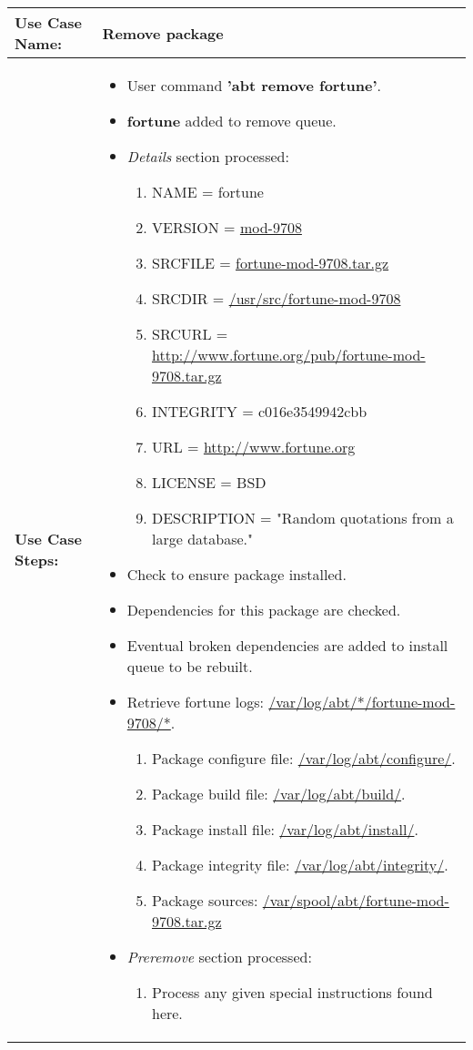 \medskip

\begin{tabularx}{\linewidth}{|l|X|}
\hline
\textbf{Use Case Name:} & \textbf{Remove package} \\
\hline
\textbf{Use Case Steps:} & 
\begin{minipage}{\linewidth} 
  \vspace{0.05em}
  \begin{itemize}
    \item User command \textbf{'abt remove fortune'}.
    \item \textbf{fortune} added to remove queue.
    \item \emph{Details} section processed:
    \begin{enumerate}
      \item NAME = fortune
      \item VERSION = \url{mod-9708}
      \item SRCFILE = \url{fortune-mod-9708.tar.gz}
      \item SRCDIR = \url{/usr/src/fortune-mod-9708}
      \item SRCURL = \url{http://www.fortune.org/pub/fortune-mod-9708.tar.gz}
      \item INTEGRITY = c016e3549942cbb
      \item URL = \url{http://www.fortune.org}
      \item LICENSE = BSD
      \item DESCRIPTION = "Random quotations from a large database."
    \end{enumerate}
    \item Check to ensure package installed.
    \item Dependencies for this package are checked.
    \item Eventual broken dependencies are added to install queue to be rebuilt.
    \item Retrieve fortune logs: \url{/var/log/abt/*/fortune-mod-9708/*}.
    \begin{enumerate}
      \item Package configure file: \url{/var/log/abt/configure/}.
      \item Package build file: \url{/var/log/abt/build/}.
      \item Package install file: \url{/var/log/abt/install/}.
      \item Package integrity file: \url{/var/log/abt/integrity/}.
      \item Package sources: \url{/var/spool/abt/fortune-mod-9708.tar.gz}
    \end{enumerate}
    \item \emph{Preremove} section processed:
    \begin{enumerate}
      \item Process any given special instructions found here.
    \end{enumerate}
  \end{itemize}
  \vspace{0.05em}
\end{minipage}
\\
\hline 
\end{tabularx}

